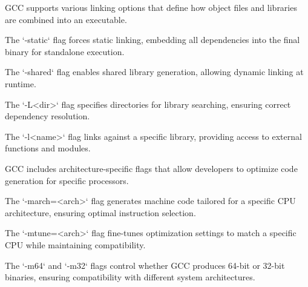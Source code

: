 \begin{NxSSSSBox}
	\begin{NxIDBox}
		GCC supports various linking options that define how object files and libraries are combined into an executable.
	\end{NxIDBox}
	\begin{NxIDBox}
		The `-static` flag forces static linking, embedding all dependencies into the final binary for standalone execution.
	\end{NxIDBox}
	\begin{NxIDBox}
		The `-shared` flag enables shared library generation, allowing dynamic linking at runtime.
	\end{NxIDBox}
	\begin{NxIDBox}
		The `-L<dir>` flag specifies directories for library searching, ensuring correct dependency resolution.
	\end{NxIDBox}
	\begin{NxIDBox}
		The `-l<name>` flag links against a specific library, providing access to external functions and modules.
	\end{NxIDBox}
\end{NxSSSSBox}

\begin{NxSSSSBox}
	\begin{NxIDBox}
		GCC includes architecture-specific flags that allow developers to optimize code generation for specific processors.
	\end{NxIDBox}
	\begin{NxIDBox}
		The `-march=<arch>` flag generates machine code tailored for a specific CPU architecture, ensuring optimal instruction selection.
	\end{NxIDBox}
	\begin{NxIDBox}
		The `-mtune=<arch>` flag fine-tunes optimization settings to match a specific CPU while maintaining compatibility.
	\end{NxIDBox}
	\begin{NxIDBox}
		The `-m64` and `-m32` flags control whether GCC produces 64-bit or 32-bit binaries, ensuring compatibility with different system architectures.
	\end{NxIDBox}
\end{NxSSSSBox}

